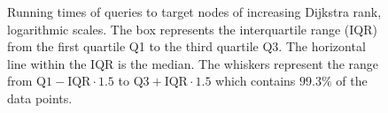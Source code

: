 \begin{figure}[hbtp]
	\centering
	\caption[Running times of queries to target nodes of increasing Dijkstra rank, logarithmic scales.]{Running times of queries to target nodes of increasing Dijkstra rank, logarithmic scales. The box represents the interquartile range (IQR) from the first quartile Q1 to the third quartile Q3. The horizontal line within the IQR is the median. The whiskers represent the range from $\text{Q1} - \text{IQR} \cdot 1.5$ to $\text{Q3} + \text{IQR} \cdot 1.5$ which contains $99.3\%$ of the data points.}
	\label{fig:rank_times}
\end{figure}
